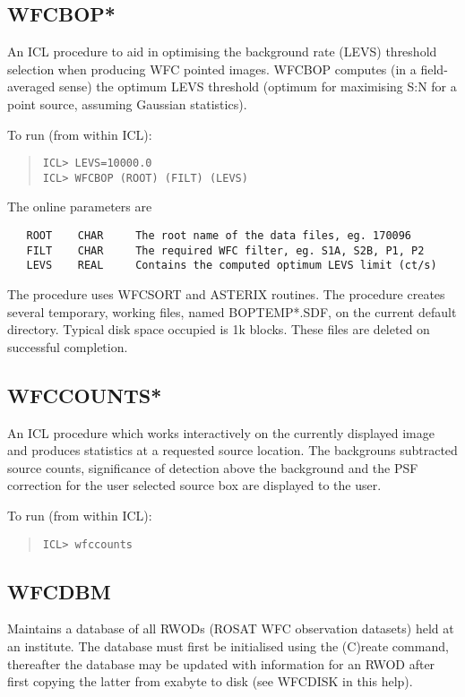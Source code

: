 \documentclass{book}
\renewcommand{\_}{{\tt\char'137}}     %
\begin{document}
\subsection{WFCBOP*}
An ICL procedure to aid in optimising the background rate (LEVS)
threshold selection when producing WFC pointed images. WFCBOP computes
(in a field-averaged sense) the optimum LEVS threshold (optimum for
maximising S:N for a point source, assuming Gaussian statistics).

To run (from within ICL):
\begin{quote}\begin{verbatim}
ICL> LEVS=10000.0
ICL> WFCBOP (ROOT) (FILT) (LEVS)
\end{verbatim}\end{quote}
The online parameters are
\begin{verbatim}
   ROOT    CHAR     The root name of the data files, eg. 170096
   FILT    CHAR     The required WFC filter, eg. S1A, S2B, P1, P2
   LEVS    REAL     Contains the computed optimum LEVS limit (ct/s)
\end{verbatim}
The procedure uses WFCSORT and ASTERIX routines. The procedure creates
several temporary, working files, named BOPTEMP*.SDF, on the current
default directory. Typical disk space occupied is 1k blocks. These
files are deleted on successful completion.

\subsection{WFCCOUNTS*}
An ICL procedure which works interactively on the currently displayed
image and produces statistics at a requested source location. The
backgrouns subtracted source counts, significance of detection above the
background and the PSF correction for the user selected source box are
displayed to the user.

To run (from within ICL):
\begin{quote}\begin{verbatim}
ICL> wfccounts
\end{verbatim}\end{quote}
\subsection{WFCDBM}
Maintains a database of all RWODs (ROSAT WFC observation datasets) held
at an institute. The database must first be initialised using the
(C)reate command, thereafter the database may be updated with
information for an RWOD after first copying the latter from exabyte to
disk (see WFCDISK in this help).
\end{document}
